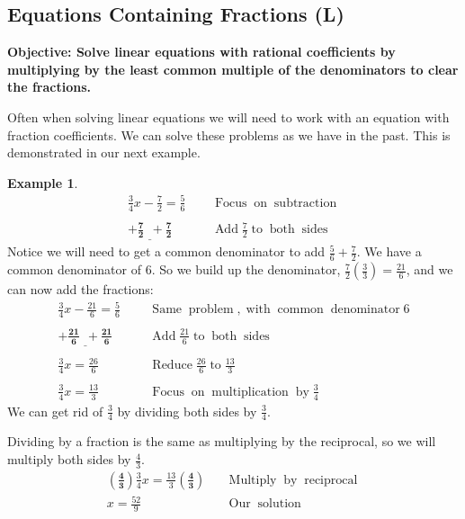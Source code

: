 \documentclass[12pt]{book}
\theoremstyle{definition}
\newtheorem{example}{Example}
\newcommand{\tmmathbf}[1]{\ensuremath{\boldsymbol{#1}}}
\newcommand{\tmop}[1]{\ensuremath{\operatorname{#1}}}
\begin{document}
\subsection{Equations Containing Fractions (L)}
{\bf Objective: Solve linear equations with rational coefficients by multiplying by the least common multiple of the denominators to clear the fractions.}\par
Often when solving linear equations we will need to work with an equation with fraction coefficients. We can solve these problems as we have in the past. This is demonstrated in our next example.
\begin{example}\label{Lin29}
  \begin{eqnarray*}
    \frac{3}{4} x - \frac{7}{2} = \frac{5}{6}~~ &  & \tmop{Focus} \tmop{on}
    \tmop{subtraction}\\
    &  & \\
    \underline{\tmmathbf{+ \frac{7}{2} ~~+ \frac{7}{2}}} &  & \tmop{Add}
    \frac{7}{2} \tmop{to} \tmop{both} \tmop{sides}
  \end{eqnarray*}
  Notice we will need to get a common denominator to add $\frac{5}{6} +
  \frac{7}{2}$.  We have a common denominator of $6$.  So we build up the denominator, $\frac{7}{2} \left( \frac{3}{3} \right) = \frac{21}{6}$, and we can now add the fractions:
  \begin{eqnarray*}
    \frac{3}{4} x - \frac{21}{6} = \frac{5}{6}~~~ &  & \tmop{Same}
    \tmop{problem}, \tmop{with} \tmop{common} \tmop{denominator} 6\\
    &  & \\
    \tmmathbf{\underline{+ \frac{21}{6} ~~+ \frac{21}{6}}} &  & \tmop{Add}
    \frac{21}{6} \tmop{to} \tmop{both} \tmop{sides}\\
    &  & \\
    \frac{3}{4} x = \frac{26}{6}~~~ &  & \tmop{Reduce} \frac{26}{6} \tmop{to}
    \frac{13}{3}\\
    &  & \\
    \frac{3}{4} x = \frac{13}{3}~~~ &  & \tmop{Focus} \tmop{on}
    \tmop{multiplication} \tmop{by} \frac{3}{4}
  \end{eqnarray*}
   We can get rid of $\frac{3}{4}$ by dividing both sides by $\frac{3}{4}$.\par
  Dividing by a fraction is the same as multiplying by the reciprocal, so we will multiply both sides by $\frac{4}{3}$.
  \begin{eqnarray*}
    \tmmathbf{\left( \frac{4}{3} \right)} \frac{3}{4} x = \frac{13}{3}
    \tmmathbf{\left( \frac{4}{3} \right)} &  & \tmop{Multiply} \tmop{by}
    \tmop{reciprocal}\\
    x = \frac{52}{9}  &  & \tmop{Our} \tmop{solution}
  \end{eqnarray*}
\end{example}
\end{document}
